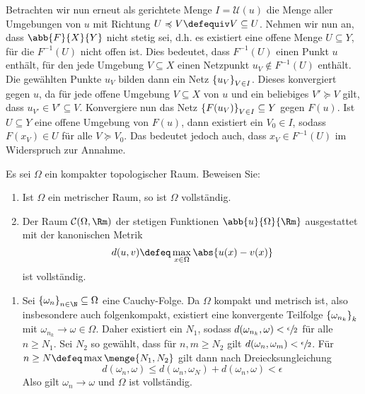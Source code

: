 \begin{exercisePage}
\begin{enumerate}[leftmargin=\zulength, label=(zu \alph*)]
\begin{proof-equivalence}
			\rueckrichtung Betrachten wir nun erneut als gerichtete Menge $I = \mathcal{U}(u)$ die Menge aller Umgebungen von $u$ mit Richtung $U \preccurlyeq V \defequiv V \subseteq U$. 
			Nehmen wir nun an, dass $\abb{F}{X}{Y}$ nicht stetig sei, d.h. es existiert eine offene Menge $U \subseteq Y$, für die $F^{-1}(U)$ nicht offen ist. Dies bedeutet, dass $F^{-1}(U)$ einen Punkt $u$ enthält, für den jede Umgebung $V \subseteq X$ einen Netzpunkt $u_V \notin F^{-1}(U)$ enthält. Die gewählten Punkte $u_V$ bilden dann ein Netz $\left\{ u_V \right\}_{V \in I}$. Dieses konvergiert gegen $u$, da für jede offene Umgebung $V \subseteq X$ von $u$ und ein beliebiges $V' \succcurlyeq V$ gilt, dass $u_{V'} \in V' \subseteq V$.
			Konvergiere nun das Netz $\left\{ F(u_V) \right\}_{V \in I} \subseteq Y$ gegen $F(u)$. Ist $U \subseteq Y$ eine offene Umgebung von $F(u)$, dann existiert ein $V_0 \in I$, sodass $F(x_V) \in U$ für alle $V \succcurlyeq V_0$. Das bedeutet jedoch auch, dass $x_V \in F^{-1}(U)$ im Widerspruch zur Annahme.
		\end{proof-equivalence}
	\end{enumerate}

	\begin{exercise}
		Es sei $\Omega$ ein kompakter topologischer Raum. Beweisen Sie:
		\begin{enumerate}
			\item Ist $\Omega$ ein metrischer Raum, so ist $\Omega$ vollständig.
			\item Der Raum $\mathcal{C}(\Omega,\Rm)$ der stetigen Funktionen $\abb{u}{\Omega}{\Rm}$ ausgestattet mit der kanonischen Metrik
			\begin{equation*}
				d(u,v) \defeq \max_{x \in \Omega} \abs{u(x) - v(x)}
			\end{equation*}
			ist vollständig.
		\end{enumerate}
	\end{exercise}
	\begin{enumerate}[leftmargin=\zulength, label=(zu \alph*)]
		\item Sei $\folge{\omega_n}{n \in \N} \subseteq \Omega$ eine Cauchy-Folge. Da $\Omega$ kompakt und metrisch ist, also insbesondere auch folgenkompakt, existiert eine konvergente Teilfolge $\left\{ \omega_{n_k} \right\}_{k}$ mit $\omega_{n_k} \to \omega \in \Omega$. Daher existiert ein $N_1$, sodass $d(\omega_{n_k},\omega) < \sfrac{\epsilon}{2}$ für alle $n \ge N_1$. Sei $N_2$ so gewählt, dass für $n,m \ge N_2$ gilt $d(\omega_n,\omega_m) < \sfrac{\epsilon}{2}$. Für $n \ge N \defeq \max\menge{N_1,N_2}$ gilt dann nach Dreiecksungleichung 
		\begin{equation*}
			d(\omega_n,\omega) \le d(\omega_n,\omega_N) + d(\omega_n,\omega) < \epsilon
		\end{equation*}
		Also gilt $\omega_n \to \omega$ und $\Omega$ ist vollständig.
	\end{enumerate}


\end{exercisePage}
